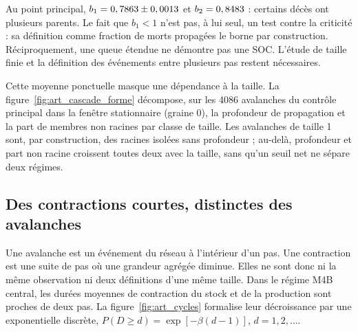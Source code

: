 Au point principal, $b_1=0,7863\pm0,0013$ et
$b_2=0,8483$ : certains décès ont plusieurs parents. Le fait que
$b_1<1$ n'est pas, à lui seul, un test contre la criticité : sa définition
comme fraction de morts propagées le borne par construction. Réciproquement,
une queue étendue ne démontre pas une SOC. L'étude de taille finie et la
définition des événements entre plusieurs pas restent nécessaires.

Cette moyenne ponctuelle masque une dépendance à la taille. La
figure~\ref{fig:art_cascade_forme} décompose, sur les 4086 avalanches
du contrôle principal dans la fenêtre stationnaire (graine 0), la
profondeur de propagation et la part de membres non racines par classe
de taille. Les avalanches de taille 1 sont, par construction, des racines
isolées sans profondeur ; au-delà, profondeur et part non racine croissent
toutes deux avec la taille, sans qu'un seuil net ne sépare deux régimes.


\subsection{Des contractions courtes, distinctes des avalanches}
Une avalanche est un événement du réseau à l'intérieur d'un pas. Une
contraction est une suite de pas où une grandeur agrégée diminue. Elles ne
sont donc ni la même observation ni deux définitions d'une même taille.
Dans le régime M4B central, les durées moyennes de contraction du stock et
de la production sont proches de deux pas. La figure~\ref{fig:art_cycles}
formalise leur décroissance par une exponentielle discrète,
$P(D\ge d)=\exp[-\beta(d-1)]$, $d=1,2,\ldots$.


